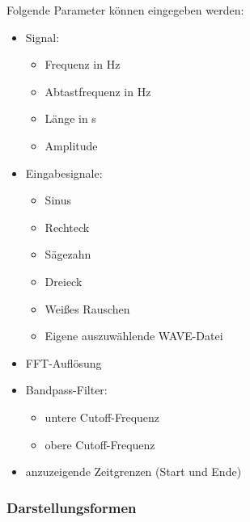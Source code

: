\documentclass[a4paper]{article}
\begin{document}
Folgende Parameter können eingegeben werden:
\begin{itemize}
  \item Signal:
  \begin{itemize}
    \item Frequenz in Hz
    \item Abtastfrequenz in Hz
    \item Länge in s
    \item Amplitude
  \end{itemize}
  \item Eingabesignale:
  \begin{itemize}
    \item Sinus
    \item Rechteck
    \item Sägezahn
    \item Dreieck
    \item Weißes Rauschen
    \item Eigene auszuwählende WAVE-Datei
  \end{itemize}
  \item FFT-Auflösung
  \item Bandpass-Filter:
  \begin{itemize}
    \item untere Cutoff-Frequenz
    \item obere Cutoff-Frequenz
  \end{itemize}
  \item anzuzeigende Zeitgrenzen (Start und Ende)
\end{itemize}

\subsubsection{Darstellungsformen}
\end{document}

